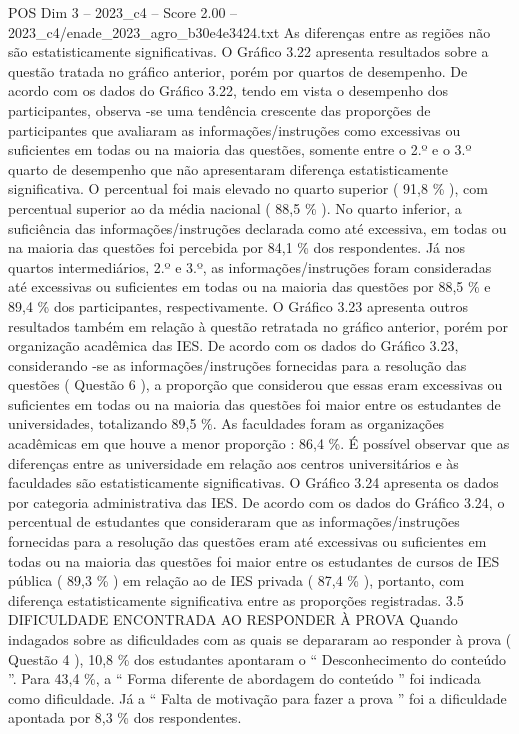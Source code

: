 \begin{textsample}{POS Dim 3 – 2023\_c4 – Score 2.00 – 2023\_c4/enade\_2023\_agro\_b30e4e3424.txt}
As diferenças entre as regiões não são estatisticamente significativas.
O Gráfico 3.22 apresenta resultados sobre a questão tratada no gráfico anterior, porém por quartos de desempenho.
De acordo com os dados do Gráfico 3.22, tendo em vista o desempenho dos participantes, observa -se uma tendência crescente das proporções de participantes que avaliaram as informações/instruções como excessivas ou suficientes em todas ou na maioria das questões, somente entre o 2.º e o 3.º quarto de desempenho que não apresentaram diferença estatisticamente significativa.
O percentual foi mais elevado no quarto superior ( 91,8 \% ), com percentual superior ao da média nacional ( 88,5 \% ).
No quarto inferior, a suficiência das informações/instruções declarada como até excessiva, em todas ou na maioria das questões foi percebida por 84,1 \% dos respondentes.
Já nos quartos intermediários, 2.º e 3.º, as informações/instruções foram consideradas até excessivas ou suficientes em todas ou na maioria das questões por 88,5 \% e 89,4 \% dos participantes, respectivamente.
O Gráfico 3.23 apresenta outros resultados também em relação à questão retratada no gráfico anterior, porém por organização acadêmica das IES.
De acordo com os dados do Gráfico 3.23, considerando -se as informações/instruções fornecidas para a resolução das questões ( Questão 6 ), a proporção que considerou que essas eram excessivas ou suficientes em todas ou na maioria das questões foi maior entre os estudantes de universidades, totalizando 89,5 \%.
As faculdades foram as organizações acadêmicas em que houve a menor proporção : 86,4 \%.
É possível observar que as diferenças entre as universidade em relação aos centros universitários e às faculdades são estatisticamente significativas.
O Gráfico 3.24 apresenta os dados por categoria administrativa das IES.
De acordo com os dados do Gráfico 3.24, o percentual de estudantes que consideraram que as informações/instruções fornecidas para a resolução das questões eram até excessivas ou suficientes em todas ou na maioria das questões foi maior entre os estudantes de cursos de IES pública ( 89,3 \% ) em relação ao de IES privada ( 87,4 \% ), portanto, com diferença estatisticamente significativa entre as proporções registradas. 3.5 DIFICULDADE ENCONTRADA AO RESPONDER À PROVA Quando indagados sobre as dificuldades com as quais se depararam ao responder à prova ( Questão 4 ), 10,8 \% dos estudantes apontaram o “ Desconhecimento do conteúdo ”.
Para 43,4 \%, a “ Forma diferente de abordagem do conteúdo ” foi indicada como dificuldade.
Já a “ Falta de motivação para fazer a prova ” foi a dificuldade apontada por 8,3 \% dos respondentes.

\end{textsample}
